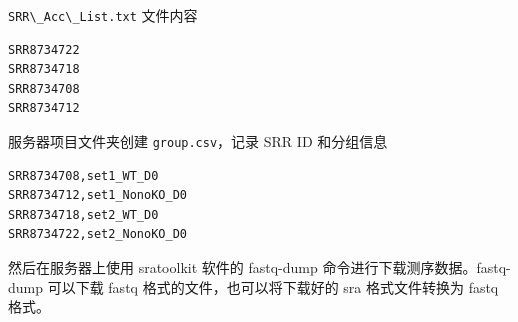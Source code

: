 \documentclass[
  a4paper,
]{article}
\newcommand{\passthrough}[1]{#1}
\begin{document}
\hspace{0pt}\passthrough{\lstinline!SRR\_Acc\_List.txt!}
\hspace{0pt}文件内容

\begin{lstlisting}
SRR8734722
SRR8734718
SRR8734708
SRR8734712
\end{lstlisting}

服务器项目文件夹创建
\passthrough{\lstinline!group.csv!}\hspace{0pt}，记录 SRR ID 和分组信息

\begin{lstlisting}
SRR8734708,set1_WT_D0
SRR8734712,set1_NonoKO_D0
SRR8734718,set2_WT_D0
SRR8734722,set2_NonoKO_D0
\end{lstlisting}

然后在服务器上使用 sratoolkit 软件的 fastq-dump
命令进行下载测序数据。fastq-dump 可以下载 fastq
格式的文件，也可以将下载好的 sra 格式文件转换为 fastq 格式。
\end{document}
